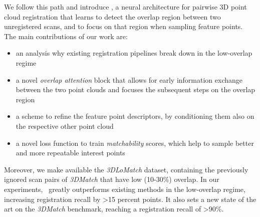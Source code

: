 We follow this path and introduce \acro,
a neural architecture for pairwise 3D point cloud registration that learns to detect the overlap region between two unregistered scans, and to focus on that region when sampling feature points.
The main contributions of our work are:
\begin{itemize}
    \item an analysis why existing registration pipelines break down in the low-overlap regime
    \item a novel \emph{overlap attention} block that allows for early information exchange between the two point clouds and focuses the subsequent steps on the overlap region
    \item a scheme to refine the feature point descriptors, by conditioning them also on the respective other point cloud
    \item a novel loss function to train \emph{matchability} scores, which help to sample better and more repeatable interest points
\end{itemize}
Moreover, we make available the \textit{3DLoMatch} dataset, containing the previously ignored scan pairs of \textit{3DMatch} that have low (10-30\%) overlap.
In our experiments, \acro\ greatly outperforms existing methods in the low-overlap regime, increasing registration recall by \textgreater15 percent points.
It also sets a new state of the art on the \textit{3DMatch} benchmark, reaching a registration recall of \textgreater90\%.
